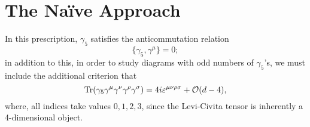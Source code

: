 \documentclass[12pt]{article}
\numberwithin{equation}{section}
\numberwithin{figure}{section}
\numberwithin{table}{section}
\begin{document}
	\section{The Na\"ive Approach}
	
	In this prescription, \(\gamma_5\) satisfies the anticommutation relation  
	\begin{equation}
	\{\gamma_5,\gamma^\mu\}=0;
	\end{equation}
	in addition to this, in order to study diagrams with odd numbers of \(\gamma_5\)'s, we must include the additional criterion that  
	\begin{equation}
	\Tr(\gamma_5\gamma^\mu\gamma^\nu\gamma^\rho\gamma^\sigma)=4i\varepsilon^{\mu\nu\rho\sigma}+\order{d-4},
	\end{equation}
	where, all indices take values \(0,1,2,3\), since the Levi-Civita tensor is inherently a 4-dimensional object. 
\end{document}
